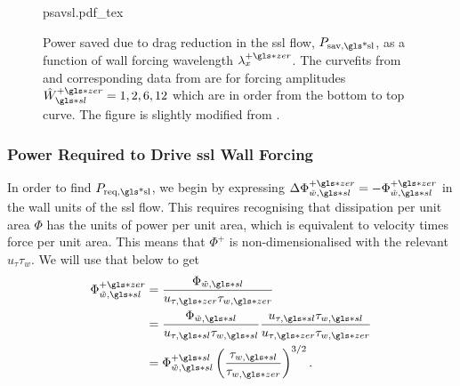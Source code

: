 \begin{figure}[htbp]
	\centering
	\def\svgwidth{0.7\textwidth}
	{psavsl.pdf_tex}
	\caption[$P_\text{sav,\gls*{sl}} $ as a function of wall forcing wavelength $\lambda_x\pz$]{Power saved due to drag reduction in the  \gls{ssl} flow, $P_\text{sav,\gls*{sl}} $, as a function of wall forcing wavelength $\lambda_x\pz$. The curvefits from \textcite{chernyshenko2013} and corresponding data from \textcite{viotti2009} are for forcing amplitudes $\hat{W}\pz\ssl=1,2,6,12$ which are in order from the bottom to top curve. The figure is slightly modified from \cite{chernyshenko2013}.} 
	\label{fig:psavsl}
\end{figure}

\subsubsection{Power Required to Drive \gls{ssl} Wall Forcing}
In order to find $P_\text{req,\gls*{sl}} $, we begin by expressing $\Delta \Phi _{\tilde{w},\gls*{sl}}\pz=-\Phi _{\tilde{w},\gls*{sl}}\pz$ in the wall units of the \gls{ssl} flow. This requires recognising that dissipation per unit area $\Phi $ has the units of power per unit area, which is equivalent to velocity times force per unit area. This means that $\Phi^{+} $ is non-dimensionalised with the relevant $u_\tau \tau_w$. We will use that below to get
\begin{align}
	\Phi _{\tilde{w},\gls*{sl}}\pz &= \frac{\Phi _{\tilde{w},\gls*{sl}}}{u_{\tau,\gls*{zer}}\tau_{w,\gls*{zer}}}\\
	&=  \frac{\Phi _{\tilde{w},\gls*{sl}}}{u_{\tau,\gls*{sl}}\tau_{w,\gls*{sl}}}\frac{u_{\tau,\gls*{sl}}\tau_{w,\gls*{sl}}}{u_{\tau,\gls*{zer}}\tau_{w,\gls*{zer}}}\\
	&= \Phi _{\tilde{w},\gls*{sl}}\ps \left( \frac{\tau_{w,\gls*{sl}}}{\tau_{w,\gls*{zer}}} \right) ^{3 /2}\label{eq:fislconv}
.\end{align}

